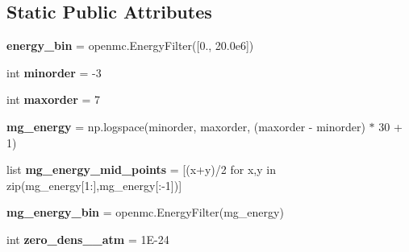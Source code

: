 \subsection*{Static Public Attributes}
\begin{DoxyCompactItemize}
\item 
\mbox{\label{classonix_1_1couple_1_1couple__openmc_1_1Couple__openmc_abd812fa132b93b2657b3acfe41217620}} 
{\bfseries energy\+\_\+bin} = openmc.\+Energy\+Filter(\mbox{[}0., 20.\+0e6\mbox{]})
\item 
\mbox{\label{classonix_1_1couple_1_1couple__openmc_1_1Couple__openmc_a8b6f579a8f335de48b31901163a45fbc}} 
int {\bfseries minorder} = -\/3
\item 
\mbox{\label{classonix_1_1couple_1_1couple__openmc_1_1Couple__openmc_ad183809c17ef0c923157e646db4a5e83}} 
int {\bfseries maxorder} = 7
\item 
\mbox{\label{classonix_1_1couple_1_1couple__openmc_1_1Couple__openmc_a2536390e0bcb2111f21b4cc226158b5e}} 
{\bfseries mg\+\_\+energy} = np.\+logspace(minorder, maxorder, (maxorder -\/ minorder) $\ast$ 30 + 1)
\item 
\mbox{\label{classonix_1_1couple_1_1couple__openmc_1_1Couple__openmc_af0a9b7b463d19c108030661748425a1f}} 
list {\bfseries mg\+\_\+energy\+\_\+mid\+\_\+points} = \mbox{[}(x+y)/2 for x,y in zip(mg\+\_\+energy\mbox{[}1\+:\mbox{]},mg\+\_\+energy\mbox{[}\+:-\/1\mbox{]})\mbox{]}
\item 
\mbox{\label{classonix_1_1couple_1_1couple__openmc_1_1Couple__openmc_ab5774fbd537b1004ccfdbd0259e50fa3}} 
{\bfseries mg\+\_\+energy\+\_\+bin} = openmc.\+Energy\+Filter(mg\+\_\+energy)
\item 
\mbox{\label{classonix_1_1couple_1_1couple__openmc_1_1Couple__openmc_ad579f51ddf4c732b20002b52c1aa373b}} 
int {\bfseries zero\+\_\+dens\+\_\+\_\+atm} = 1\+E-\/24

\end{DoxyCompactItemize}
